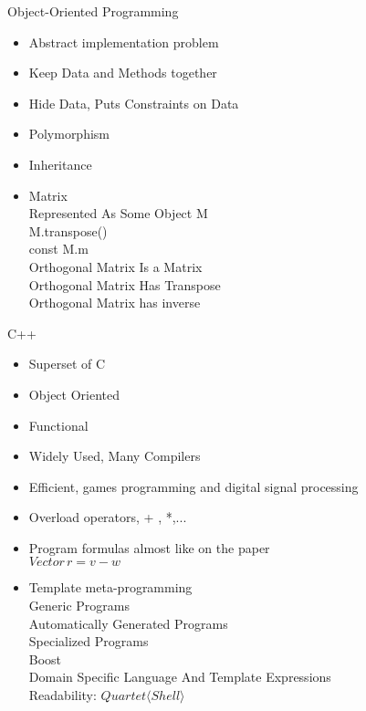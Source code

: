 \documentclass{beamer}
\begin{document}
\begin{frame}{ Object-Oriented Programming}
\begin{itemize}
\item Abstract implementation problem 
\item Keep Data and Methods together
\item Hide Data, Puts Constraints on Data
\item Polymorphism 
\item Inheritance
\item Matrix\\
Represented As Some Object M\\
M.transpose()\\
const M.m\\
Orthogonal Matrix Is a Matrix\\
Orthogonal Matrix Has Transpose\\
Orthogonal Matrix  has inverse\\
\end{itemize}
\end{frame}


\begin{frame}{  C++}
\begin{itemize}
\item Superset of C
\item Object Oriented
\item Functional
\item Widely Used, Many Compilers
\item Efficient, games programming and digital signal processing
\item Overload operators, + , *,...
\item Program formulas almost like on the paper\\
$Vector\, r = v-w $\\
\item Template meta-programming\\
 Generic Programs\\
 Automatically Generated Programs\\
 Specialized Programs\\
 Boost\\
Domain Specific Language And Template Expressions\\
Readability: $Quartet \langle Shell \rangle$
\end{itemize}
\end{frame}
\end{document}
